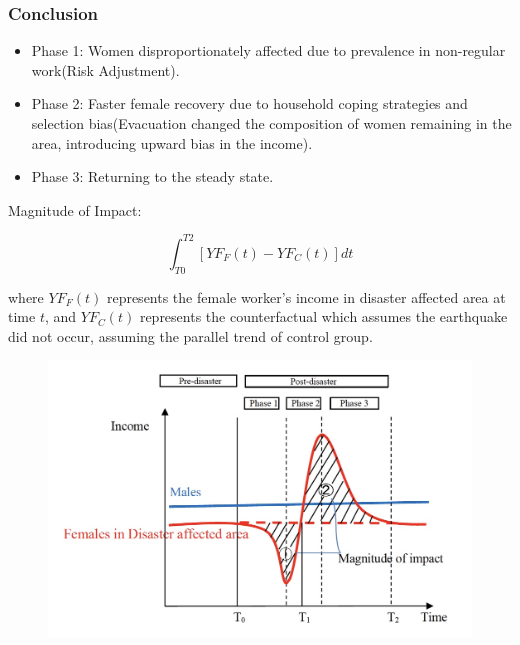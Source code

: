 \documentclass[serif, aspectratio=169]{beamer}
\newcommand{\conclusionlinks}{%
    \vfill %
    \hfill %
    {\small %
        \hyperlink{real_GDP_growth_rate}{\beamerbutton{→ GRP}} \,
        \hyperlink{image}{\beamerbutton{→ Image}} \,
        \hyperlink{LFP}{\beamerbutton{→ LFP}} \,

    }
}
\begin{document}


\begin{frame}[label=conclusion]

\frametitle{Conclusion}

    \begin{minipage}[c]{0.4\linewidth}
        \small

        \vspace{-1.4cm}
        

{\footnotesize
\begin{itemize}
    \item Phase 1: Women disproportionately affected due to prevalence in non-regular work(Risk Adjustment).
    \item Phase 2: Faster female recovery due to household coping strategies and selection bias(Evacuation changed the composition of women remaining in the area, introducing upward bias in the income).
    \item Phase 3: Returning to the steady state.
\end{itemize}

}

{\tiny
Magnitude of Impact:
}


{\tiny
\begin{equation}
\int_{T0}^{T2} [YF_F(t) - YF_C(t)] dt
\end{equation}
}

{\tiny
where $YF_F(t)$ represents the female worker's income in disaster affected area at time $t$, and $YF_C(t)$ represents the counterfactual which assumes the earthquake did not occur, assuming the parallel trend of control group.
}

        
        \vspace{-2.1cm}
        

    \end{minipage}\hspace{0.5cm}
    \begin{minipage}{0.2\linewidth}
        \medskip
        \begin{figure}[h]
            \centering
            \includegraphics[height=.7\textheight]{Final_conceptual_model.jpeg}
        \end{figure}
    \end{minipage}

\conclusionlinks

\end{frame}
\end{document}
